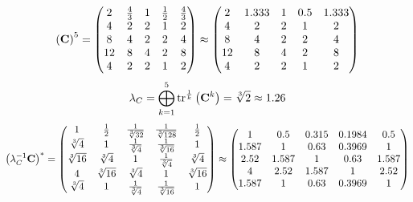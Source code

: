 \documentclass[10pt,a4paper]{article}
\begin{document}
	\[
		\left(\bold{C}\right)^{5} = 
		\begin{pmatrix}
			{{2}} {} & \frac{{4}} {{3}} & {1} {} & \frac{1} {{2}} & \frac{{4}} {{3}} \\
			{{4}} {} & {{2}} {} & {{2}} {} & {1} {} & {{2}} {} \\
			{{8}} {} & {{4}} {} & {{2}} {} & {{2}} {} & {{4}} {} \\
			{{12}} {} & {{8}} {} & {{4}} {} & {{2}} {} & {{8}} {} \\
			{{4}} {} & {{2}} {} & {{2}} {} & {1} {} & {{2}} {} \\
		\end{pmatrix}
		\approx
		\begin{pmatrix}
			2        & 1.333    & 1        & 0.5      & 1.333    \\
			4        & 2        & 2        & 1        & 2        \\
			8        & 4        & 2        & 2        & 4        \\
			12       & 8        & 4        & 2        & 8        \\
			4        & 2        & 2        & 1        & 2        \\
		\end{pmatrix}
	\]
	\[
		\lambda_{C} =  \bigoplus ^{5} _{k = 1} \operatorname{tr} ^{\frac 1 k} \left( \bold{C} ^k \right) = {\sqrt[3]{2}} {}\approx 1.26
	\]
	\[
		\left(\lambda_{C}^{-1}\bold{C}\right)^* = 
		\begin{pmatrix}
			{1} {} & \frac{1} {{2}} & \frac{1} {\sqrt[3]{32}} & \frac{1} {\sqrt[3]{128}} & \frac{1} {{2}} \\
			{\sqrt[3]{4}} {} & {1} {} & \frac{1} {\sqrt[3]{4}} & \frac{1} {\sqrt[3]{16}} & {1} {} \\
			{\sqrt[3]{16}} {} & {\sqrt[3]{4}} {} & {1} {} & \frac{1} {\sqrt[3]{4}} & {\sqrt[3]{4}} {} \\
			{{4}} {} & {\sqrt[3]{16}} {} & {\sqrt[3]{4}} {} & {1} {} & {\sqrt[3]{16}} {} \\
			{\sqrt[3]{4}} {} & {1} {} & \frac{1} {\sqrt[3]{4}} & \frac{1} {\sqrt[3]{16}} & {1} {} \\
		\end{pmatrix}
		\approx
		\begin{pmatrix}
			1        & 0.5      & 0.315    & 0.1984   & 0.5      \\
			1.587    & 1        & 0.63     & 0.3969   & 1        \\
			2.52     & 1.587    & 1        & 0.63     & 1.587    \\
			4        & 2.52     & 1.587    & 1        & 2.52     \\
			1.587    & 1        & 0.63     & 0.3969   & 1        \\
		\end{pmatrix}
	\]
\end{document}
